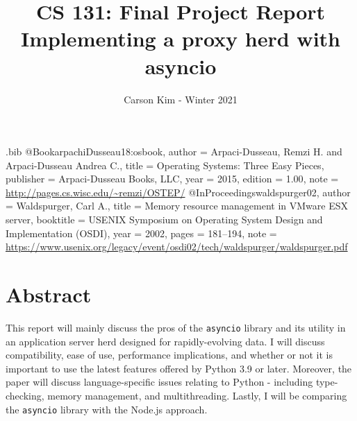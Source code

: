\usepackage{filecontents}

\usepackage{graphicx}
\graphicspath{{\downloads }}

\begin{filecontents}{\jobname.bib}
@Book{arpachiDusseau18:osbook,
  author =       {Arpaci-Dusseau, Remzi H. and Arpaci-Dusseau Andrea C.},
  title =        {Operating Systems: Three Easy Pieces},
  publisher =    {Arpaci-Dusseau Books, LLC},
  year =         2015,
  edition =      {1.00},
  note =         {\url{http://pages.cs.wisc.edu/~remzi/OSTEP/}}
}
@InProceedings{waldspurger02,
  author =       {Waldspurger, Carl A.},
  title =        {Memory resource management in {VMware ESX} server},
  booktitle =    {USENIX Symposium on Operating System Design and
                  Implementation (OSDI)},
  year =         2002,
  pages =        {181--194},
  note =         {\url{https://www.usenix.org/legacy/event/osdi02/tech/waldspurger/waldspurger.pdf}}}
\end{filecontents}


\title{\bf CS 131: Final Project Report \\ 
		\large Implementing a proxy herd with asyncio}
\author{Carson Kim - Winter 2021}
\maketitle

\section{Abstract}

This report will mainly discuss the pros of the \verb +asyncio+ library and its utility in an application server herd designed for rapidly-evolving data. I will discuss compatibility, ease of use, performance implications, and whether or not it is important to use the latest features offered by Python 3.9 or later. Moreover, the paper will discuss language-specific issues relating to Python - including type-checking, memory management, and multithreading. Lastly, I will be comparing the  \verb +asyncio+ library with the Node.js approach. 


